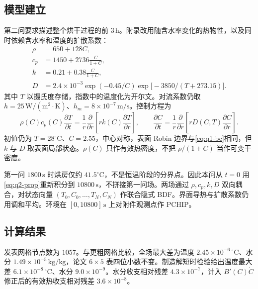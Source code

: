 \subsection{模型建立}

第二问要求描述整个烘干过程的前 $3\,\mathrm{h}$。附录改用随含水率变化的热物性，以及同时依赖含水率和温度的扩散系数：
\begin{equation}
\begin{aligned}
\rho&=650+128C,\\
c_p&=1450+2736\frac{C}{1+C},\\
k&=0.21+0.38\frac{C}{1+C},\\
D&=2.4\times10^{-3}\exp(-0.45/C)\exp\bigl[-3850/(T+273.15)\bigr].
\end{aligned}
\label{eq:q2-prop}
\end{equation}
其中 $T$ 以摄氏度存储，指数中的温度化为开尔文。对流系数仍取 $h=25\,\mathrm{W/(m^2\cdot K)}$、$h_m=8\times10^{-7}\,\mathrm{m/s}$。控制方程为
\begin{equation}
\rho(C)c_p(C)\frac{\partial T}{\partial t}
=\frac1r\frac{\partial}{\partial r}\left[rk(C)\frac{\partial T}{\partial r}\right],
\qquad
\frac{\partial C}{\partial t}
=\frac1r\frac{\partial}{\partial r}\left[rD(C,T)\frac{\partial C}{\partial r}\right].
\label{eq:q2-pde}
\end{equation}
初值仍为 $T=28^\circ\mathrm{C}$、$C=2.55$，中心对称，表面 Robin 边界与\eqref{eq:q1-bc}相同，但 $k$ 与 $D$ 取表面局部状态。$\rho(C)$ 只作有效热密度，不把 $\rho/(1+C)$ 当作可变干密度。

第一问 $1800\,\mathrm{s}$ 时烘房仅约 $41.5^\circ\mathrm{C}$，不是恒温阶段的分界点。因此本问从 $t=0$ 用\eqref{eq:q2-prop}重新积分到 $10800\,\mathrm{s}$，不拼接第一问场。两场通过 $\rho,c_p,k,D$ 双向耦合，对状态向量 $(T_0,C_0,\ldots,T_N,C_N)$ 作联合隐式 BDF。界面导热与扩散系数仍用调和平均。环境在 $[0,10800]\,\mathrm{s}$ 上对附件观测点作 PCHIP。

\subsection{计算结果}

发表网格节点数为 $1057$。与更粗网格比较，全场最大差为温度 $2.45\times10^{-6}\,{}^\circ\mathrm{C}$、水分 $1.49\times10^{-5}\,\mathrm{kg/kg}$，论文 $6\times5$ 表四位小数不变。制造解短时检验给出温度最大差 $6.1\times10^{-8}\,{}^\circ\mathrm{C}$、水分 $9.0\times10^{-9}$。水分收支相对残差 $4.3\times10^{-7}$，计入 $B'(C)\dot C$ 修正后的有效热收支相对残差 $3.6\times10^{-8}$。

